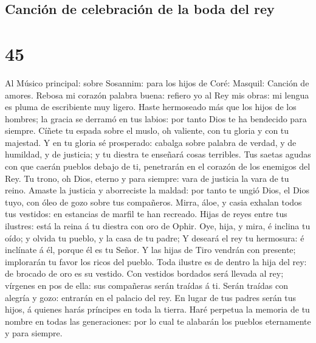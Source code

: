 \hypertarget{canciuxf3n-de-celebraciuxf3n-de-la-boda-del-rey}{%
\subsection{Canción de celebración de la boda del
rey}\label{canciuxf3n-de-celebraciuxf3n-de-la-boda-del-rey}}

\hypertarget{section-44}{%
\section{45}\label{section-44}}

 Al Músico principal: sobre Sosannim: para los hijos de
Coré: Masquil: Canción de amores. Rebosa mi corazón palabra buena:
refiero yo al Rey mis obras: mi lengua es pluma de escribiente muy
ligero.  Haste hermoseado más que los hijos de los
hombres; la gracia se derramó en tus labios: por tanto Dios te ha
bendecido para siempre.  Cíñete tu espada sobre el muslo,
oh valiente, con tu gloria y con tu majestad.  Y en tu
gloria sé prosperado: cabalga sobre palabra de verdad, y de humildad, y
de justicia; y tu diestra te enseñará cosas terribles. 
Tus saetas agudas con que caerán pueblos debajo de ti, penetrarán en el
corazón de los enemigos del Rey.  Tu trono, oh Dios,
eterno y para siempre: vara de justicia la vara de tu reino.
 Amaste la justicia y aborreciste la maldad: por tanto te
ungió Dios, el Dios tuyo, con óleo de gozo sobre tus compañeros.
 Mirra, áloe, y casia exhalan todos tus vestidos: en
estancias de marfil te han recreado.  Hijas de reyes entre
tus ilustres: está la reina á tu diestra con oro de Ophir.
 Oye, hija, y mira, é inclina tu oído; y olvida tu
pueblo, y la casa de tu padre;  Y deseará el rey tu
hermosura: é inclínate á él, porque él es tu Señor.  Y
las hijas de Tiro vendrán con presente; implorarán tu favor los ricos
del pueblo.  Toda ilustre es de dentro la hija del rey:
de brocado de oro es su vestido.  Con vestidos bordados
será llevada al rey; vírgenes en pos de ella: sus compañeras serán
traídas á ti.  Serán traídas con alegría y gozo: entrarán
en el palacio del rey.  En lugar de tus padres serán tus
hijos, á quienes harás príncipes en toda la tierra.  Haré
perpetua la memoria de tu nombre en todas las generaciones: por lo cual
te alabarán los pueblos eternamente y para siempre.

